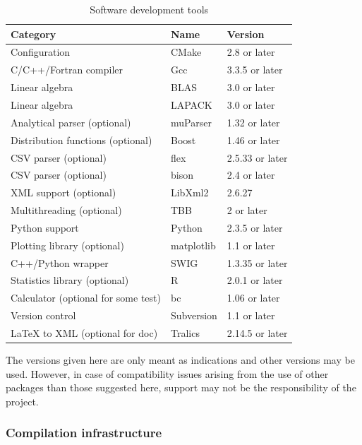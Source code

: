 \begin{center}
\begin{table}[h]
\caption{\label{tools}Software development tools}
\begin{center}
\begin{tabular}{|l|l|l|}
\hline
\textbf{Category} & \textbf{Name} & \textbf{Version} \\
\hline \hline
Configuration & CMake & 2.8 or later \\
C/C++/Fortran compiler & Gcc & 3.3.5 or later \\
Linear algebra & BLAS & 3.0 or later \\
Linear algebra & LAPACK & 3.0 or later \\
Analytical parser (optional) & muParser & 1.32 or later \\
Distribution functions (optional) & Boost & 1.46 or later \\
CSV parser (optional) & flex & 2.5.33 or later \\
CSV parser (optional) & bison & 2.4 or later \\
XML support (optional) & LibXml2 & 2.6.27 \\
Multithreading (optional) & TBB & 2 or later \\
Python support & Python & 2.3.5 or later \\
Plotting library (optional) & matplotlib & 1.1 or later \\
C++/Python wrapper & SWIG & 1.3.35 or later \\
Statistics library (optional) & R & 2.0.1 or later \\
Calculator (optional for some test) & bc & 1.06 or later \\
Version control & Subversion & 1.1 or later \\
LaTeX to XML (optional for doc) & Tralics & 2.14.5 or later \\
\hline
\end{tabular}
\end{center}
\end{table}
\end{center}

The versions given here are only meant as indications and other versions may be used. However, in case of compatibility issues arising from the use of other packages than those suggested here, support may not be the responsibility of the project.

\subsubsection{Compilation infrastructure}

